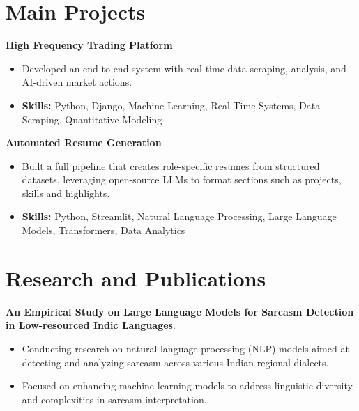 \documentclass[a4paper,11pt]{article}
\begin{document}
\section{\textbf{Main Projects}}

\vspace{1mm}
  \textbf{High Frequency Trading Platform  }
\vspace{-1.5mm} %
\begin{itemize}
  \item Developed an end-to-end system with real-time data scraping, analysis, and AI-driven market actions.
\vspace{-3mm}
  \item \textbf{Skills:} Python, Django, Machine Learning, Real-Time Systems, Data Scraping, Quantitative Modeling
\end{itemize}


\vspace{1mm}
   \textbf{Automated Resume Generation }
\vspace{-1.5mm} %
\begin{itemize}
  \item Built a full pipeline that creates role-specific resumes from structured datasets, leveraging open-source LLMs to format sections such as projects, skills and highlights.
\vspace{-3mm}
  \item \textbf{Skills:} Python, Streamlit, Natural Language Processing, Large Language Models, Transformers, Data Analytics
\end{itemize}



\section{\textbf{Research and Publications} \hfill }
\vspace{1mm}
  \textbf{An Empirical Study on Large Language Models for Sarcasm Detection in Low-resourced Indic Languages}.
\vspace{-1mm} %
\begin{itemize}
  \item Conducting research on natural language processing (NLP) models aimed at detecting and analyzing sarcasm across various Indian regional dialects.
\vspace{-3mm}
  \item Focused on enhancing machine learning models to address linguistic diversity and complexities in sarcasm interpretation.
\end{itemize}
\end{document}
